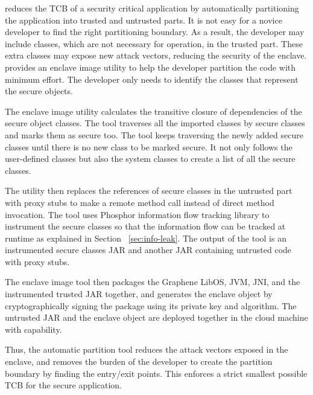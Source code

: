 \label{sec:partitioning}
\sysname{} reduces the TCB of a security critical 
application by automatically partitioning the 
application into trusted and untrusted parts. It is not 
easy for a novice developer to find the right 
partitioning boundary. As a result, the developer may 
include classes, which are not necessary for operation, 
in the trusted part. These extra classes may expose new 
attack vectors, reducing the security of the enclave. 
\sysname{} provides an enclave image utility to help 
the developer partition the code with minimum effort. 
The developer only needs to identify the classes that 
represent the secure objects.

The enclave image utility calculates the transitive 
closure of dependencies of the secure object classes.
The tool traverses all the imported classes by secure 
classes and marks them as secure too. The tool keeps 
traversing the newly added secure classes until there 
is no new class to be marked secure. It not only 
follows the user-defined classes but also the system 
classes to create a list of all the secure classes.

The utility then replaces the references of secure classes in the untrusted part with proxy stubs to make a remote method call instead of direct method invocation. The tool uses Phosphor information  flow tracking library to instrument the secure classes so that the information flow can be tracked at runtime as explained in Section ~\ref{sec:info-leak}. The output of the tool is an instrumented secure classes JAR and another JAR containing untrusted code with proxy stubs.

The enclave image tool then packages the Graphene LibOS, JVM, JNI, and the instrumented trusted JAR together, and generates the enclave object by cryptographically signing the package using its private key and  algorithm. The untrusted JAR and the enclave object are deployed together in the cloud machine with \sgx{} capability. 

Thus, the automatic partition tool reduces the attack vectors exposed in the enclave, and removes the burden of the developer to create the partition boundary by finding the entry/exit points. This enforces a strict smallest possible TCB for the secure application.

